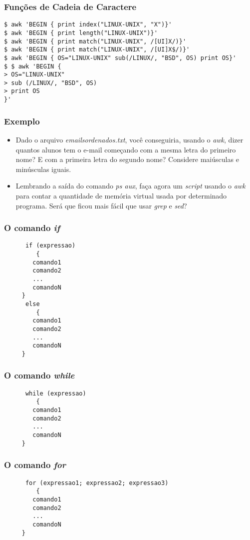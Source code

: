\documentclass{beamer}
\begin{document}
   \begin{frame}[fragile]
      \frametitle{Funções de Cadeia de Caractere}
      \footnotesize
      \begin{verbatim}
$ awk 'BEGIN { print index("LINUX-UNIX", "X")}'
$ awk 'BEGIN { print length("LINUX-UNIX")}'
$ awk 'BEGIN { print match("LINUX-UNIX", /[UI]X/)}'
$ awk 'BEGIN { print match("LINUX-UNIX", /[UI]X$/)}'
$ awk 'BEGIN { OS="LINUX-UNIX" sub(/LINUX/, "BSD", OS) print OS}'
$ $ awk 'BEGIN {
> OS="LINUX-UNIX"
> sub (/LINUX/, "BSD", OS)
> print OS
}'
      \end{verbatim}
\end{frame}

   \begin{frame}
      \frametitle{Exemplo}
      \begin{itemize}
         \item Dado o arquivo \textit{emailsordenados.txt}, você conseguiria, usando o \textit{awk}, dizer quantos alunos tem o e-mail começando com a mesma letra do primeiro nome? E com a primeira letra do segundo nome? Considere maiúsculas e minúsculas iguais.
	 \item Lembrando a saída do comando \textit{ps aux}, faça agora um \textit{script} usando o \textit{awk} para contar a quantidade de memória virtual usada por determinado programa. Será que ficou mais fácil que usar \textit{grep} e \textit{sed}?
      \end{itemize}
   \end{frame}

   \begin{frame}[fragile]
      \frametitle{O comando \textit{if}}
      \begin{verbatim}
      if (expressao)
         {
	    comando1
	    comando2
	    ...
	    comandoN
	 }
      else 
         {
	    comando1
	    comando2
	    ...
	    comandoN
	 }
      \end{verbatim}
\end{frame}

   \begin{frame}[fragile]
      \frametitle{O comando \textit{while}}
      \begin{verbatim}
      while (expressao)
         {
	    comando1
	    comando2
	    ...
	    comandoN
	 }
      \end{verbatim}
\end{frame}

   \begin{frame}[fragile]
      \frametitle{O comando \textit{for}}
      \begin{verbatim}
      for (expressao1; expressao2; expressao3)
         {
	    comando1
	    comando2
	    ...
	    comandoN
	 }
      \end{verbatim}
\end{frame}
\end{document}
